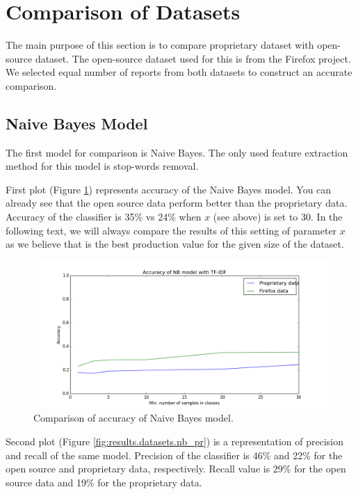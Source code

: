 \section{Comparison of Datasets}

The main purpose of this section is to compare proprietary dataset with open-source dataset. The open-source dataset used for this is from the Firefox project. We selected equal number of reports from both datasets to construct an accurate comparison.

\subsection{Naive Bayes Model}

The first model for comparison is Naive Bayes. The only used feature extraction method for this model is stop-words removal.

First plot (Figure \ref{fig:results.datasets.nb_accuracy}) represents accuracy of the Naive Bayes model. You can already see that the open source data perform better than the proprietary data. Accuracy of the classifier is 35\% vs 24\% when $x$ (see above) is set to 30. In the following text, we will always compare the results of this setting of parameter $x$ as we believe that is the best production value for the given size of the dataset.

\begin{figure}[htbp]
    \centering
        \includegraphics[width=\textwidth]{./images/prop_vs_os/nb_accuracy.png}
    \caption{Comparison of accuracy of Naive Bayes model.}
    \label{fig:results.datasets.nb_accuracy}
\end{figure}

Second plot (Figure \ref{fig:results.datasets.nb_pr}) is a representation of precision and recall of the same model. Precision of the classifier is 46\% and 22\% for the open source and proprietary data, respectively. Recall value is 29\% for the open source data and 19\% for the proprietary data.

